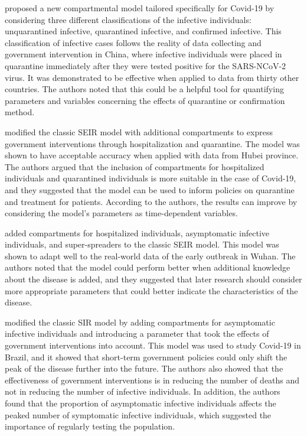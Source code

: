 \citeauthor{zhaoModelingEpidemicDynamics2020} \cite{zhaoModelingEpidemicDynamics2020} proposed a new compartmental model tailored specifically for Covid-19 by considering three different classifications of the infective individuals: unquarantined infective, quarantined infective, and confirmed infective.
This classification of infective cases follows the reality of data collecting and government intervention in China, where infective individuals were placed in quarantine immediately after they were tested positive for the SARS-NCoV-2 virus.
It was demonstrated to be effective when applied to data from thirty other countries.
The authors noted that this could be a helpful tool for quantifying parameters and variables concerning the effects of quarantine or confirmation method.

\citeauthor{heSEIRModelingCOVID192020} \cite{heSEIRModelingCOVID192020} modified the classic \gls{SEIR} model with additional compartments to express government interventions through hospitalization and quarantine.
The model was shown to have acceptable accuracy when applied with data from Hubei province.
The authors argued that the inclusion of compartments for hospitalized individuals and quarantined individuals is more suitable in the case of Covid-19, and they suggested that the model can be used to inform policies on quarantine and treatment for patients.
According to the authors, the results can improve by considering the model's parameters as time-dependent variables.

\citeauthor{ndairouMathematicalModelingCOVID192020} \cite{ndairouMathematicalModelingCOVID192020} added compartments for hospitalized individuals, asymptomatic infective individuals, and super-spreaders to the classic \gls{SEIR} model.
This model was shown to adapt well to the real-world data of the early outbreak in Wuhan.
The authors noted that the model could perform better when additional knowledge about the disease is added, and they suggested that later research should consider more appropriate parameters that could better indicate the characteristics of the disease.

\citeauthor{bastosModelingForecastingEarly2020} \cite{bastosModelingForecastingEarly2020} modified the classic \gls{SIR} model by adding compartments for asymptomatic infective individuals and introducing a parameter that took the effects of government interventions into account.
This model was used to study Covid-19 in Brazil, and it showed that short-term government policies could only shift the peak of the disease further into the future.
The authors also showed that the effectiveness of government interventions is in reducing the number of deaths and not in reducing the number of infective individuals.
In addition, the authors found that the proportion of asymptomatic infective individuals affects the peaked number of symptomatic infective individuals, which suggested the importance of regularly testing the population.

